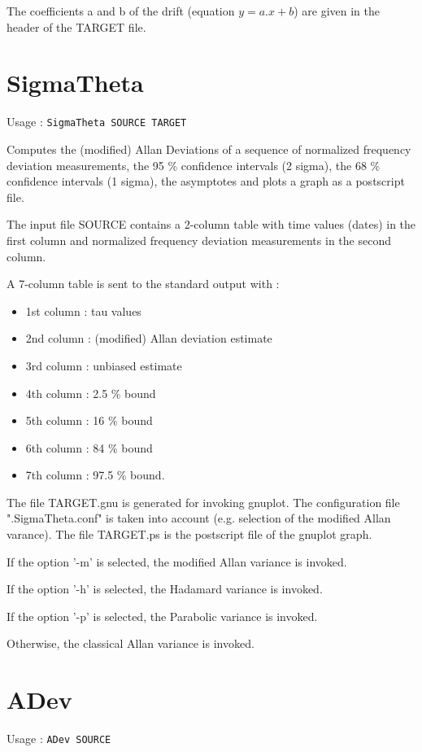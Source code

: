 \documentclass[10pt,a4paper,french]{article}
\begin{document}
The coefficients a and b of the drift (equation $y=a.x+b$) are given in the header of the TARGET file.

\section{SigmaTheta}

Usage : {\tt{SigmaTheta SOURCE TARGET}}

Computes the (modified) Allan Deviations of a sequence of normalized frequency deviation measurements, the 95 \% confidence intervals (2 sigma), the 68 \% confidence intervals (1 sigma), the asymptotes and plots a graph as a postscript file.

The input file SOURCE contains a 2-column table with time values (dates) in the first column and normalized frequency deviation measurements in the second column.

A 7-column table is sent to the standard output with :
\begin{itemize}
\item   1st column : tau values
\item   2nd column : (modified) Allan deviation estimate
\item   3rd column : unbiased estimate
\item   4th column : 2.5 \% bound
\item   5th column : 16 \% bound
\item   6th column : 84 \% bound
\item   7th column : 97.5 \% bound.
\end{itemize}

The file TARGET.gnu is generated for invoking gnuplot. The configuration file ".SigmaTheta.conf" is taken into account (e.g. selection of the modified Allan varance).
The file TARGET.ps is the postscript file of the gnuplot graph.

If the option ’-m’ is selected, the modified Allan variance is invoked.

If the option ’-h’ is selected, the Hadamard variance is invoked.

If the option ’-p’ is selected, the Parabolic variance is invoked.

Otherwise, the classical Allan variance is invoked.

\section{ADev}

Usage : {\tt{ADev SOURCE}}
\end{document}
